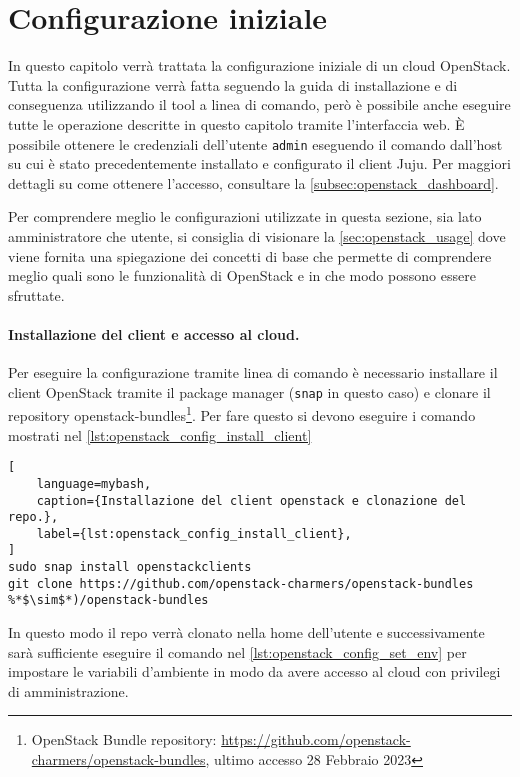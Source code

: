 \section{Configurazione iniziale}\label{sec:openstack_configurazioni_iniziali}
In questo capitolo verrà trattata la configurazione iniziale di un cloud OpenStack. Tutta la configurazione verrà fatta seguendo la guida di installazione \cite{openstack_configure} e di conseguenza utilizzando il tool a linea di comando, però è possibile anche eseguire tutte le operazione descritte in questo capitolo tramite l'interfaccia web. È possibile ottenere le credenziali dell'utente \verb|admin| eseguendo il comando  dall'host su cui è stato precedentemente installato e configurato il client Juju.
% 
Per maggiori dettagli su come ottenere l'accesso, consultare la \cref{subsec:openstack_dashboard}.

Per comprendere meglio le configurazioni utilizzate in questa sezione, sia lato amministratore che utente, si consiglia di visionare la \cref{sec:openstack_usage} dove viene fornita una spiegazione dei concetti di base che permette di comprendere meglio quali sono le funzionalità di OpenStack e in che modo possono essere sfruttate.


\paragraph{Installazione del client e accesso al cloud.}
Per eseguire la configurazione tramite linea di comando è necessario installare il client OpenStack tramite il package manager (\texttt{snap} in questo caso) e clonare il repository openstack-bundles\footnote{OpenStack Bundle repository: \url{https://github.com/openstack-charmers/openstack-bundles}, ultimo accesso 28 Febbraio 2023}. 
% 
Per fare questo si devono eseguire i comando mostrati nel \cref{lst:openstack_config_install_client}

\begin{lstlisting}[
    language=mybash, 
    caption={Installazione del client openstack e clonazione del repo.},
    label={lst:openstack_config_install_client},
]
sudo snap install openstackclients
git clone https://github.com/openstack-charmers/openstack-bundles %*$\sim$*)/openstack-bundles
\end{lstlisting}

\noindent
In questo modo il repo verrà clonato nella home dell'utente e successivamente sarà sufficiente eseguire il comando nel \cref{lst:openstack_config_set_env} per impostare le variabili d'ambiente in modo da avere accesso al cloud con privilegi di amministrazione.

